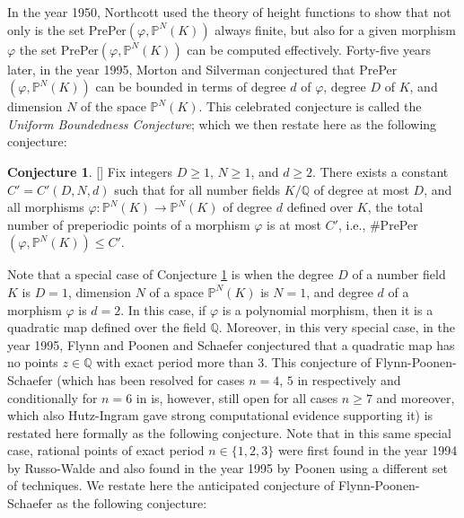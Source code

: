 \documentclass{article}
\theoremstyle{plain}
\theoremstyle{definition}
\newtheorem{conj}[thm]{Conjecture}
\begin{document}
In the year 1950, Northcott \cite{North} used the theory of height functions to show that not only is the set PrePer$(\varphi, {\mathbb{P}^N(K)})$ always finite, but also for a given morphism $\varphi$ the set PrePer$(\varphi, {\mathbb{P}^N(K)})$ can be computed effectively. Forty-five years later, in the year 1995, Morton and Silverman conjectured that PrePer$(\varphi, \mathbb{P}^N(K))$ can be bounded in terms of degree $d$ of $\varphi$, degree $D$ of $K$, and dimension $N$ of the space ${\mathbb{P}^N(K)}$. This celebrated conjecture is called the \textit{Uniform Boundedness Conjecture}; which we then restate here as the following conjecture:

\begin{conj} \label{silver-morton}[\cite{Morton}]
Fix integers $D \geq 1$, $N \geq 1$, and $d \geq 2$. There exists a constant $C'= C'(D, N, d)$ such that for all number fields $K/{\mathbb{Q}}$ of degree at most $D$, and all morphisms $\varphi: {\mathbb{P}^N}(K) \rightarrow {\mathbb{P}^N}(K)$ of degree $d$ defined over $K$, the total number of preperiodic points of a morphism $\varphi$ is at most $C'$, i.e., \#PrePer$(\varphi, \mathbb{P}^N(K)) \leq C'$.
\end{conj}
\noindent Note that a special case of Conjecture \ref{silver-morton} is when the degree $D$ of a number field $K$ is $D = 1$, dimension $N$ of a space $\mathbb{P}^N(K)$ is $N = 1$, and degree $d$ of a morphism $\varphi$ is $d = 2$. In this case, if $\varphi$ is a polynomial morphism, then it is a quadratic map defined over the field $\mathbb{Q}$. Moreover, in this very special case, in the year 1995, Flynn and Poonen and Schaefer conjectured that a quadratic map has no points $z\in\mathbb{Q}$ with exact period more than 3. This conjecture of Flynn-Poonen-Schaefer \cite{Flynn} (which has been resolved for cases $n = 4$, $5$ in \cite{mor, Flynn} respectively and conditionally for $n=6$ in \cite{Stoll} is, however, still open for all cases $n\geq 7$ and moreover, which also Hutz-Ingram \cite{Ingram} gave strong computational evidence supporting it) is restated here formally as the following conjecture. Note that in this same special case, rational points of exact period $n\in \{1, 2, 3\}$ were first found in the year 1994 by Russo-Walde \cite{Russo} and also found in the year 1995 by Poonen \cite{Poonen} using a different set of techniques. We restate here the anticipated conjecture of Flynn-Poonen-Schaefer as the following conjecture: 
 
\end{document}
